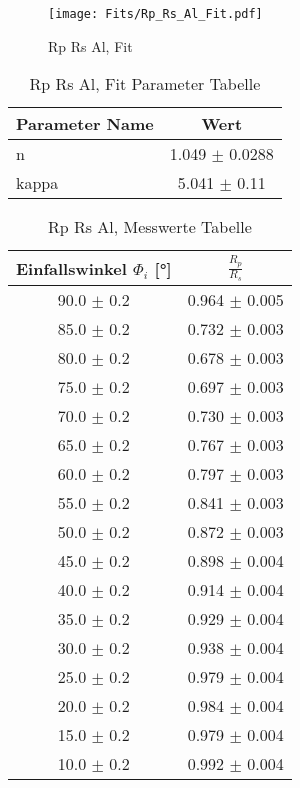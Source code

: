 \begin{figure}[ht] 
 	\centering 
 	\texttt{[image: Fits/Rp\_Rs\_Al\_Fit.pdf]} 
	\caption{Rp Rs Al, Fit} 
 	\label{fig:Rp Rs Al, Fit} 
\end{figure}
 
\begin{table}[ht] 
	\centering 
	\caption{Rp Rs Al, Fit Parameter Tabelle} 
	\label{tab: Rp Rs Al, Fit Parameter Tabelle}
	\begin{tabular}{|l|c|}
		\hline
		Parameter Name	&	Wert \\ \hline
		n	&	 1.049 $\pm$  0.0288\\ \hline
		kappa	&	 5.041 $\pm$  0.11\\ \hline
	\end{tabular} 
\end{table}
 
\begin{table}[ht] 
	\centering 
	\caption{Rp Rs Al, Messwerte Tabelle} 
	\label{tab: Rp Rs Al, Messwerte Tabelle}
	\begin{tabular}{|c|c|}
		\hline
		Einfallswinkel $\Phi_i$ [°] 	&	 $\frac{R_p}{R_s}$\\ \hline
		90.0 $\pm$ 0.2 	&	 0.964 $\pm$ 0.005 \\ \hline
		85.0 $\pm$ 0.2 	&	 0.732 $\pm$ 0.003 \\ \hline
		80.0 $\pm$ 0.2 	&	 0.678 $\pm$ 0.003 \\ \hline
		75.0 $\pm$ 0.2 	&	 0.697 $\pm$ 0.003 \\ \hline
		70.0 $\pm$ 0.2 	&	 0.730 $\pm$ 0.003 \\ \hline
		65.0 $\pm$ 0.2 	&	 0.767 $\pm$ 0.003 \\ \hline
		60.0 $\pm$ 0.2 	&	 0.797 $\pm$ 0.003 \\ \hline
		55.0 $\pm$ 0.2 	&	 0.841 $\pm$ 0.003 \\ \hline
		50.0 $\pm$ 0.2 	&	 0.872 $\pm$ 0.003 \\ \hline
		45.0 $\pm$ 0.2 	&	 0.898 $\pm$ 0.004 \\ \hline
		40.0 $\pm$ 0.2 	&	 0.914 $\pm$ 0.004 \\ \hline
		35.0 $\pm$ 0.2 	&	 0.929 $\pm$ 0.004 \\ \hline
		30.0 $\pm$ 0.2 	&	 0.938 $\pm$ 0.004 \\ \hline
		25.0 $\pm$ 0.2 	&	 0.979 $\pm$ 0.004 \\ \hline
		20.0 $\pm$ 0.2 	&	 0.984 $\pm$ 0.004 \\ \hline
		15.0 $\pm$ 0.2 	&	 0.979 $\pm$ 0.004 \\ \hline
		10.0 $\pm$ 0.2 	&	 0.992 $\pm$ 0.004 \\ \hline
	\end{tabular} 
\end{table}
 
